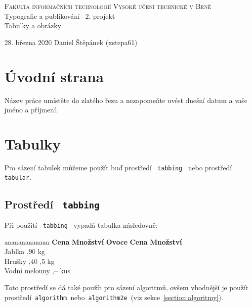 \documentclass[a4paper, 11pt]{article}
\begin{document}
	\begin{titlepage}
		\begin{center}
			\Huge
			\textsc{Fakulta informačních technologií Vysoké učení technické v Brně}\\[0.4em]
	\LARGE{Typografie a publikování\,--\,2. projekt\\[0.3em]}
	\Huge{Tabulky a obrázky}
	
		\end{center}

{\LARGE 28. března 2020 \hfill Daniel Štěpánek (xstepa61)}
	\end{titlepage}


\section{Úvodní strana}
Název práce umístěte do zlatého řezu a nezapomeňte uvést dnešní datum a vaše jméno a příjmení.

\section{Tabulky}
Pro sázení tabulek můžeme použít buď prostředí \verb| tabbing | nebo prostředí \verb| tabular|.

\subsection{Prostředí \texttt{ tabbing }}
Při použití \verb| tabbing | vypadá tabulka následovně:
\begin{tabbing}
aaaaaaaaaaaaa \quad	\= \textbf{Cena} \quad	\= \textbf{Množství}	\kill
		\textbf{Ovoce}		\> \textbf{Cena}		\> \textbf{Množství}	\\
		Jablka				,90				 kg					\\
		Hrušky				,40				,5 kg				\\
		Vodní melouny		,--				 kus		

\end{tabbing}

Toto prostředí se dá také použít pro sázení algoritmů, ovšem vhodnější je použít
	prostředí\verb| algorithm |nebo\verb| algorithm2e |(viz sekce~\ref{section:algoritmy}).
\end{document}
